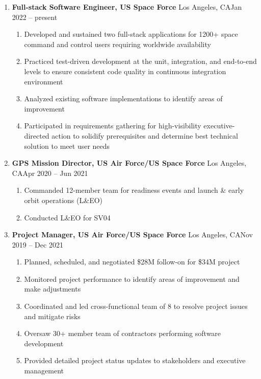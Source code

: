 \documentclass[11pt]{article}
\begin{document}
\begin{enumerate}[label={}, itemsep=5pt]
    \item \textbf{Full-stack Software Engineer, US Space Force} \textbar{} Los Angeles, CA\hfill Jan 2022 -- present
    \begin{enumerate}[label={\textbf{-}}]
        \item Developed and sustained two full-stack applications for 1200+ space command and control users requiring worldwide availability
        \item Practiced test-driven development at the unit, integration, and end-to-end levels to ensure consistent code quality in continuous integration environment
        \item Analyzed existing software implementations to identify areas of improvement
        \item Participated in requirements gathering for high-visibility executive-directed action to solidify prerequisites and determine best technical solution to meet user needs
    \end{enumerate}
    \item \textbf{GPS Mission Director, US Air Force/US Space Force} \textbar{} Los Angeles, CA\hfill Apr 2020 -- Jun 2021
    \begin{enumerate}[label={$\cdot$}]
        \item Commanded 12-member team for readiness events and launch \& early orbit operations (L\&EO)
        \item Conducted L\&EO for SV04
    \end{enumerate}
    \item \textbf{Project Manager, US Air Force/US Space Force} \textbar{} Los Angeles, CA\hfill Nov 2019 -- Dec 2021
    \begin{enumerate}[label={{\boldmath$\cdot$}}]
        \item Planned, scheduled, and negotiated \$28M follow-on for \$34M project
        \item Monitored project performance to identify areas of improvement and make adjustments
        \item Coordinated and led cross-functional team of 8 to resolve project issues and mitigate risks
        \item Oversaw 30+ member team of contractors performing software development
        \item Provided detailed project status updates to stakeholders and executive management
    \end{enumerate}

\end{enumerate}
\end{document}
